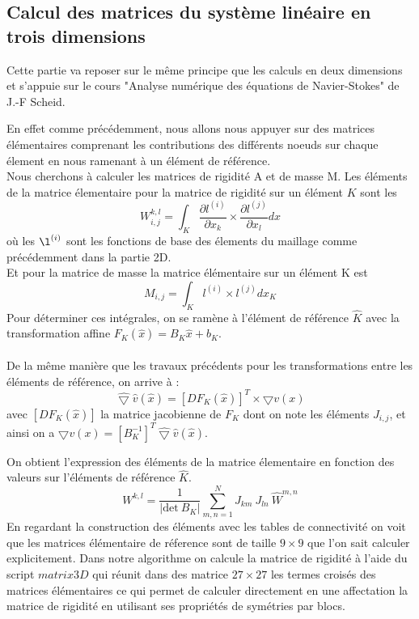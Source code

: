 \documentclass[a4paper,12pt,titlepage]{report}
\begin{document}
\begin{onehalfspace}
\newpage
\subsection{Calcul des matrices du système linéaire en trois dimensions}

Cette partie va reposer sur le même principe que les calculs en deux dimensions et s'appuie sur le cours "Analyse numérique des équations de
Navier-Stokes" de J.-F Scheid.

En effet comme précédemment, nous allons nous appuyer sur des matrices élémentaires comprenant les contributions des différents noeuds sur chaque élement en nous ramenant à un élément de référence.  \\
Nous cherchons à calculer les matrices de rigidité A et de masse M.
Les éléments de la matrice élementaire pour la matrice de rigidité sur un élément $K$ sont les 
\[
W_{i,j}^{k,l}=\int_K \frac{\partial l^{(i)}}{\partial x_k} \times \frac{\partial l^{(j)}}{\partial x_l}dx
\]
où les  $\l^{(i)}$ sont les fonctions de base des élements du maillage comme précédemment dans la partie 2D. \\
Et pour la matrice de masse la matrice élémentaire sur un élément K est
\[
M_{i,j}=\int_K l^{(i)}\times l^{(j)}dx
_K 
\]
 Pour déterminer ces intégrales, on se ramène à l'élément de référence $\hat{K}$ avec la transformation affine
$F_K(\hat{x})=B_K \hat{x} + b_K$.
\\
\\
De la même manière que les travaux précédents pour les transformations entre les éléments de référence, on arrive à :
\[
\hat{\bigtriangledown}\hat{v}(\hat{x})= [DF_K(\hat{x})]^T\times \bigtriangledown v(x)
\]
avec $[DF_K(\hat{x})]$ la matrice jacobienne de $F_K$ dont on note les éléments $J_{i,j}$, et ainsi on a $\bigtriangledown v(x) = [B_K^{-1}]^T\hat{\bigtriangledown} \hat{v}(\hat{x})$.

On obtient l'expression des éléments de la matrice élementaire en fonction des valeurs sur l'éléments de référence $\hat{K}$.
\[
W^{k,l} = \frac{1}{|\text{det} \ B_K|}\sum_{m,n=1}^{N} J_{km}\ J_{ln}\ \hat{W}^{m,n}
\]
En regardant la construction des éléments avec les tables de connectivité on voit que les matrices élémentaire de réference sont de taille $9\times 9$ que l'on sait calculer explicitement.
Dans notre algorithme on calcule la matrice de rigidité à l'aide du script $matrix3D$ qui réunit dans des matrice $27\times 27$ les termes croisés des matrices élémentaires ce qui permet de calculer directement en une affectation la matrice de rigidité en utilisant ses propriétés de symétries par blocs.


\end{onehalfspace}
\end{document}
